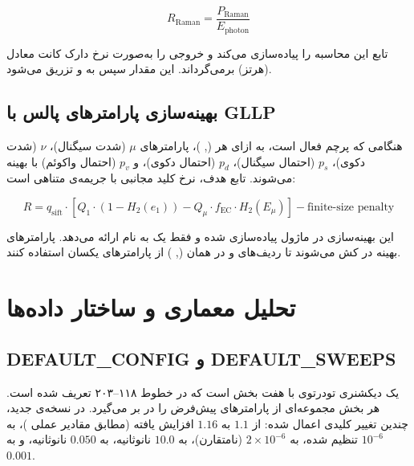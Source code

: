 \begin{equation}
	R_{\text{Raman}} = \frac{P_{\text{Raman}}}{E_{\text{photon}}}
\end{equation}

تابع  این محاسبه را پیاده‌سازی می‌کند و خروجی را به‌صورت نرخ دارک کانت معادل (هرتز) برمی‌گرداند. این مقدار سپس به  و  تزریق می‌شود.

\subsection{بهینه‌سازی پارامترهای پالس با GLLP}

هنگامی که پرچم  فعال است، به ازای هر (, )، پارامترهای $\mu$ (شدت سیگنال)، $\nu$ (شدت دکوی)، $p_s$ (احتمال سیگنال)، $p_d$ (احتمال دکوی)، و $p_v$ (احتمال واکوئم) با  بهینه می‌شوند. تابع هدف، نرخ کلید مجانبی  با جریمه‌ی متناهی است:

\begin{equation}
	R = q_{\text{sift}} \cdot \left[ Q_1 \cdot (1 - H_2(e_1)) - Q_\mu \cdot f_{\text{EC}} \cdot H_2(E_\mu) \right] - \text{finite-size penalty}
\end{equation}

این بهینه‌سازی در ماژول  پیاده‌سازی شده و  فقط یک  به نام  ارائه می‌دهد. پارامترهای بهینه در  کش می‌شوند تا ردیف‌های  و  در همان (, ) از پارامترهای یکسان استفاده کنند.

\section{تحلیل معماری و ساختار داده‌ها}

\subsection{DEFAULT\_CONFIG و DEFAULT\_SWEEPS}

 یک دیکشنری تودرتوی با هفت بخش است که در خطوط ۱۱۸–۲۰۳ تعریف شده است. هر بخش مجموعه‌ای از پارامترهای پیش‌فرض را در بر می‌گیرد. در نسخه‌ی جدید، چندین تغییر کلیدی اعمال شده:  از $1.1$ به $1.16$ افزایش یافته (مطابق مقادیر عملی )،  به $10^{-6}$ تنظیم شده،  به $2 \times 10^{-6}$ (نامتقارن)،  به $10.0$ نانوثانیه،  به $0.050$ نانوثانیه، و  به $0.001$.

